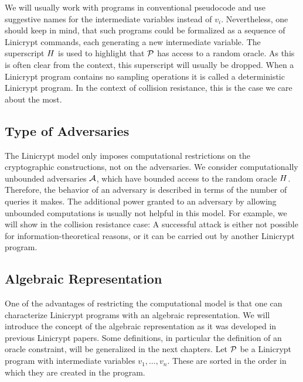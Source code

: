 We will usually work with programs in conventional pseudocode and use suggestive names for the intermediate variables instead of $v_i$.
Nevertheless, one should keep in mind,
that such programs could be formalized as a sequence of Linicrypt commands,
each generating a new intermediate variable.
The superscript $\H$ is used to highlight that $\P$ has access to a random oracle.
As this is often clear from the context, this superscript will usually be dropped.
When a Linicrypt program contains no sampling operations it is called a deterministic Linicrypt program. 
In the context of collision resistance, this is the case we care about the most.

\subsection{Type of Adversaries}
The Linicrypt model only imposes computational restrictions on the cryptographic constructions,
not on the adversaries.
We consider computationally unbounded adversaries $\A$,
which have bounded access to the random oracle $\H$.
Therefore, the behavior of an adversary is described in terms of the number of queries it makes.
The additional power granted to an adversary by allowing unbounded computations is usually not helpful in this model.
For example, we will show in the collision resistance case:
A successful attack is either not possible for information-theoretical reasons,
or it can be carried out by another Linicrypt program.

\subsection{Algebraic Representation}

One of the advantages of restricting the computational model is that one can characterize
Linicrypt programs with an algebraic representation.
We will introduce the concept of the algebraic representation as it was developed in previous Linicrypt papers.
Some definitions, in particular the definition of an oracle constraint, will be generalized in the next chapters.
Let $\P$ be a Linicrypt program with intermediate variables $v_1, \dots, v_n$.
These are sorted in the order in which they are created in the program.

